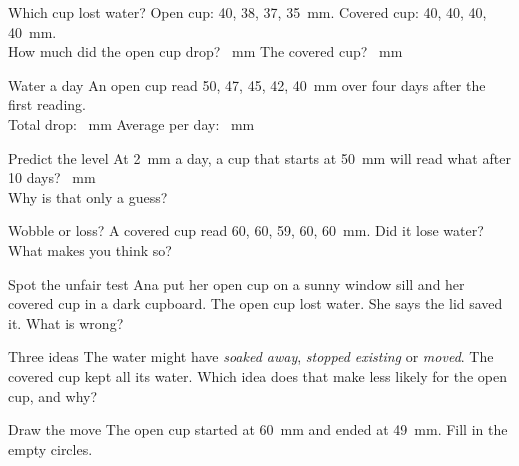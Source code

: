\clearpage

\begin{puzzle}{Which cup lost water?}
Open cup: 40, 38, 37, 35~mm. Covered cup: 40, 40, 40, 40~mm.\\
How much did the open cup drop? \wline[1.6cm]~mm \quad The covered cup? \wline[1.6cm]~mm
\end{puzzle}

\begin{puzzle}{Water a day}
An open cup read 50, 47, 45, 42, 40~mm over four days after the first reading.\\
Total drop: \wline[1.6cm]~mm \quad Average per day: \wline[1.6cm]~mm
\end{puzzle}

\begin{puzzle}{Predict the level}
At 2~mm a day, a cup that starts at 50~mm will read what after 10 days? \wline[1.8cm]~mm\\
Why is that only a guess? \wline[5cm]
\end{puzzle}

\begin{puzzle}{Wobble or loss?}
A covered cup read 60, 60, 59, 60, 60~mm. Did it lose water? \wline[2cm]\\
What makes you think so? \wline[5cm]
\end{puzzle}

\begin{puzzle}{Spot the unfair test}
Ana put her open cup on a sunny window sill and her covered cup in a dark cupboard. The open cup lost water. She says the lid saved it. What is wrong? \wline[6cm]
\end{puzzle}

\clearpage

\begin{puzzle}{Three ideas}
The water might have \emph{soaked away}, \emph{stopped existing} or \emph{moved}. The covered cup kept all its water. Which idea does that make less likely for the open cup, and why? \wline[6cm]
\end{puzzle}

\begin{puzzle}{Draw the move}
The open cup started at 60~mm and ended at 49~mm. Fill in the empty circles.
\begin{center}
\end{center}
\end{puzzle}

